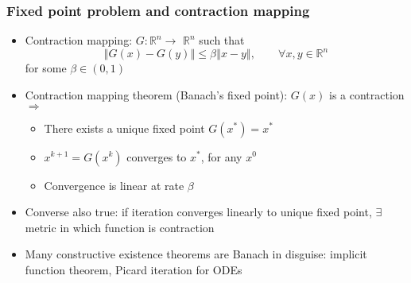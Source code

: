\documentclass[bigger]{beamer}
\begin{document}
\begin{frame}%

\frametitle{Fixed point problem and contraction mapping}

\begin{itemize}
\item Contraction mapping: $G:\mathbb{R}^{n}\rightarrow $ $\mathbb{R}^{n}$
such that%
\begin{equation*}
\left\Vert G(x)-G(y)\right\Vert \leq \beta \left\Vert x-y\right\Vert ,\qquad
\forall x,y\in \mathbb{R}^{n}
\end{equation*}%
for some $\beta \in (0,1)$

\item Contraction mapping theorem (Banach's fixed point): $G(x)$ is a contraction $\Rightarrow $

\begin{itemize}
\item There exists a unique fixed point $G(x^{\ast })=x^{\ast }$

\item $x^{k+1}=G(x^{k})$ converges to $x^{\ast }$, for any $x^{0}$

\item Convergence is linear at rate $\beta $
\end{itemize}

\item Converse also true: if iteration converges linearly to unique fixed point, $\exists$ metric in which function is contraction
\item Many constructive existence theorems are Banach in disguise: implicit function theorem, Picard iteration for ODEs


\end{itemize}


\end{frame}%
\end{document}
